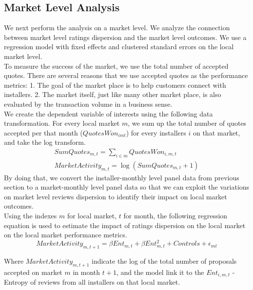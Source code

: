 \documentclass[msom,blindrev]{informs3}
\begin{document}
\subsection{Market Level Analysis}
We next perform the analysis on a market level. We analyze the connection between market level ratings dispersion and the market level outcomes.  We use a regression model with fixed effects and clustered standard errors on the local market level. \\
To measure the success of the market, we use the total number of accepted quotes. There are several reasons that we use accepted quotes as the performance metrics: 1. The goal of the market place is to help customers connect with installers. 2. The market itself, just like many other market place, is also evaluated by the transaction volume in a business sense. \\
We create the dependent variable of interests using the following data transformation. For every local market $m$, we sum up the total number of quotes accepted per that month ($QuotesWon_{imt}$) for every installers $i$ on that market, and take the log transform.
\begin{align*}
SumQuotes_{m,t}=\sum_{i\in m} QuotesWon_{i,m,t}\\
MarketActivity_{m,t}=\log (SumQuotes_{m,t}+1)
\end{align*}
By doing that, we convert the installer-monthly level panel data from previous section to a market-monthly level panel data so that we can exploit the variations on market level reviews dispersion to identify their impact on local market outcomes.  \\
Using the indexes $m$ for local market, $t$ for month, the following regression equation is used to estimate the impact of ratings dispersion on the local market on the local market performance metrics.
\begin{equation}
    MarketActivity_{m,t+1}=\beta Ent_{m,t}+\beta Ent_{m,t}^2+Controls+\epsilon_{mt}
\end{equation}

Where $MarketActivity_{m,t+1}$ indicate the log of the total number of proposals accepted on market $m$ in month $t+1$, and the model link it to the $Ent_{i,m,t}$ - Entropy of reviews from all installers on that local market.
\end{document}
